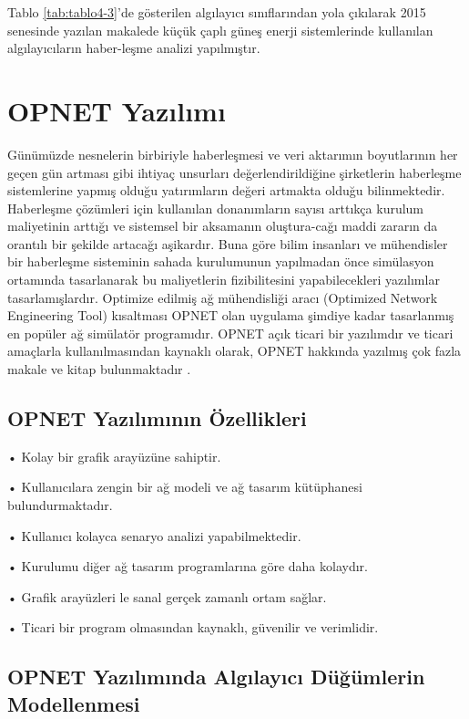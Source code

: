 Tablo \ref{tab:tablo4-3}’de gösterilen algılayıcı sınıflarından yola çıkılarak 2015 senesinde yazılan makalede küçük çaplı güneş enerji sistemlerinde kullanılan algılayıcıların haber-leşme analizi yapılmıştır. \cite{ahmed2015communication}

\section{OPNET Yazılımı}

Günümüzde nesnelerin birbiriyle haberleşmesi ve veri aktarımın boyutlarının her geçen gün artması gibi ihtiyaç unsurları değerlendirildiğine şirketlerin haberleşme sistemlerine yapmış olduğu yatırımların değeri artmakta olduğu bilinmektedir. Haberleşme çözümleri için kullanılan donanımların sayısı arttıkça kurulum maliyetinin arttığı ve sistemsel bir aksamanın oluştura-cağı maddi zararın da orantılı bir şekilde artacağı aşikardır. Buna göre bilim insanları ve mühendisler bir haberleşme sisteminin sahada kurulumunun yapılmadan önce simülasyon ortamında tasarlanarak bu maliyetlerin fizibilitesini yapabilecekleri yazılımlar tasarlamışlardır. Optimize edilmiş ağ mühendisliği aracı (Optimized Network Engineering Tool) kısaltması OPNET olan uygulama şimdiye kadar tasarlanmış en popüler ağ simülatör programıdır. OPNET açık ticari bir yazılımdır ve ticari amaçlarla kullanılmasından kaynaklı olarak, OPNET hakkında yazılmış çok fazla makale ve kitap bulunmaktadır \cite{lu2012unlocking}\cite{sethi2012practical}. 


\subsection{OPNET Yazılımının Özellikleri}

•	Kolay bir grafik arayüzüne sahiptir.

•	Kullanıcılara zengin bir ağ modeli ve ağ tasarım kütüphanesi bulundurmaktadır.

•	Kullanıcı kolayca senaryo analizi yapabilmektedir.

•	Kurulumu diğer ağ tasarım programlarına göre daha kolaydır.

•	Grafik arayüzleri le sanal gerçek zamanlı ortam sağlar.

•	Ticari bir program olmasından kaynaklı, güvenilir ve verimlidir.




\subsection{OPNET Yazılımında Algılayıcı Düğümlerin Modellenmesi}

